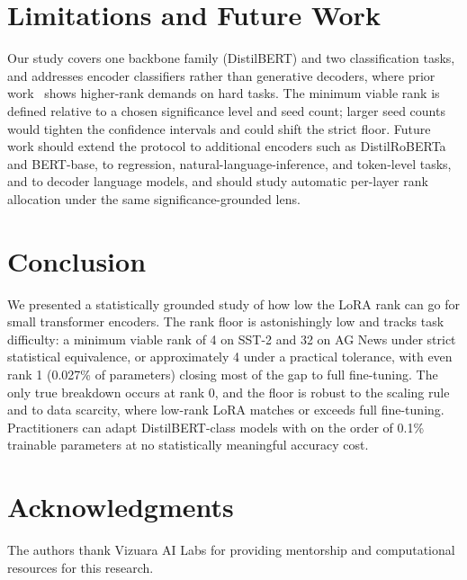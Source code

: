 \documentclass[conference]{IEEEtran}
\begin{document}
\FloatBarrier
\section{Limitations and Future Work}
\label{sec:limitations}
Our study covers one backbone family (DistilBERT) and two classification tasks, and addresses encoder classifiers rather than generative decoders, where prior work~\cite{biderman2024lora} shows higher-rank demands on hard tasks. The minimum viable rank is defined relative to a chosen significance level and seed count; larger seed counts would tighten the confidence intervals and could shift the strict floor. Future work should extend the protocol to additional encoders such as DistilRoBERTa and BERT-base, to regression, natural-language-inference, and token-level tasks, and to decoder language models, and should study automatic per-layer rank allocation under the same significance-grounded lens.

\section{Conclusion}
\label{sec:conclusion}
We presented a statistically grounded study of how low the LoRA rank can go for small transformer encoders. The rank floor is astonishingly low and tracks task difficulty: a minimum viable rank of 4 on SST-2 and 32 on AG News under strict statistical equivalence, or approximately 4 under a practical tolerance, with even rank 1 (0.027\% of parameters) closing most of the gap to full fine-tuning. The only true breakdown occurs at rank 0, and the floor is robust to the scaling rule and to data scarcity, where low-rank LoRA matches or exceeds full fine-tuning. Practitioners can adapt DistilBERT-class models with on the order of 0.1\% trainable parameters at no statistically meaningful accuracy cost.

\section*{Acknowledgments}
The authors thank Vizuara AI Labs for providing mentorship and computational resources for this research.
\end{document}
